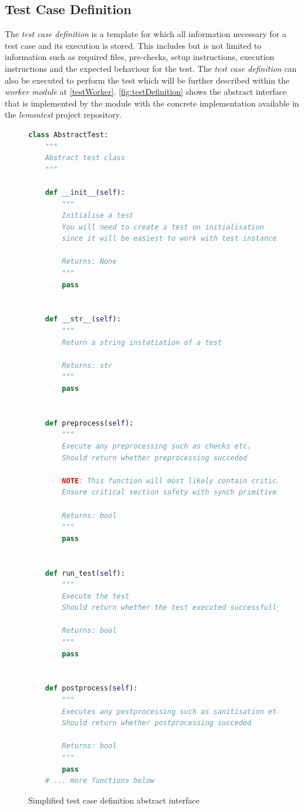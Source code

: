 \documentclass[hidelinks]{report}
\begin{document}
\subsection{Test Case Definition}\label{testCaseDef}
The \textit{test case definition} is a template for which all information necessary for a test case and its execution is stored. This includes but is not limited to information such as required files, pre-checks, setup instructions, execution instructions and the expected behaviour for the test. The \textit{test case definition} can also be executed to perform the test which will be further described within the \textit{worker module} at \autoref{testWorker}. \autoref{fig:testDefinition} shows the abstract interface that is implemented by the module with the concrete implementation available in the \textit{lemontest} project repository.
\begin{figure}[h]
	\centering
	\begin{lstlisting}[language=python, breaklines=true, linewidth=\linewidth, tabsize=4]
class AbstractTest:
    """
    Abstract test class
    """

    def __init__(self):
        """
        Initialise a test
        You will need to create a test on initialisation
        since it will be easiest to work with test instances

        Returns: None
        """
        pass


    def __str__(self):
        """
        Return a string instatiation of a test

        Returns: str
        """
        pass


    def preprocess(self):
        """
        Execute any preprocessing such as checks etc.
        Should return whether preprocessing succeded
        
        NOTE: This function will most likely contain critical sections
        Ensure critical section safety with synch primitives (mutex lock etc.)

        Returns: bool
        """
        pass


    def run_test(self):
        """
        Execute the test
        Should return whether the test executed successfully

        Returns: bool
        """
        pass


    def postprocess(self):
        """
        Executes any postprocessing such as sanitisation etc.
        Should return whether postprocessing succeded

        Returns: bool
        """
        pass
    # ... more functions below
	\end{lstlisting}
	\caption{Simplified test case definition abstract interface}
	\label{fig:testDefinition}
\end{figure}
\end{document}
